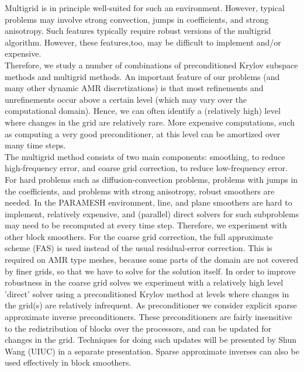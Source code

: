 \documentclass{report}
\begin{document}
Multigrid is in principle well-suited for such an environment. However,
typical problems may involve strong convection, jumps in coefficients,
and strong anisotropy. Such features typically require robust versions of
the multigrid algorithm. However, these features,too, may be difficult to
implement and/or expensive.\\

Therefore, we study a number of combinations of
preconditioned Krylov subspace methods and multigrid methods. An
important feature of our problems (and many other dynamic AMR
discretizations) is that most refinements and unrefinements occur above a
certain level (which may vary over the computational domain). Hence, we
can often identify a (relatively high) level where changes in the grid
are relatively rare. More expensive computations, such as computing a
very good preconditioner, at this level can be amortized over many time
steps.\\

The multigrid method consists of two main components: smoothing,
to reduce high-frequency error, and coarse grid correction, to
reduce low-frequency error. For hard problems such as
diffusion-convection problems, problems with jumps in the
coefficients, and problems with strong anisotropy, robust
smoothers are needed. In the PARAMESH environment, line, and plane
smoothers are hard to implement, relatively expensive, and
(parallel) direct solvers for such subproblems may need to be
recomputed at every time step. Therefore, we experiment with other block
smoothers. For the coarse grid correction, the full
approximate scheme (FAS) is used instead of the usual
residual-error correction. This is required on AMR type meshes,
because some parts of the domain are not covered by finer grids,
so that we have to solve for the solution itself. In order to
improve robustness in the coarse grid solves we experiment with a
relatively high level 'direct' solver using a preconditioned
Krylov method at levels where changes in the grid(s) are
relatively infrequent. As preconditioner we consider explicit
sparse approximate inverse preconditioners. These preconditioners are
fairly insensitive to the redistribution of blocks over the processors,
and can be updated for changes in the grid. Techniques for doing such
updates will be presented by Shun Wang (UIUC) in a separate presentation.
Sparse approximate inverses can also be used effectively in block
smoothers.\\
\end{document}
